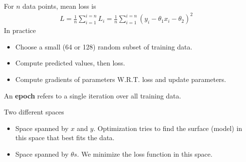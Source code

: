 \begin{frame}%
	For $n$ data points, mean  loss is 
	\begin{align*}
		L = \frac{1}{n} \sum_{i=1}^{i=n}L_i  
		  = \frac{1}{n} \sum_{i=1}^{i=n} (y_i-\theta_1 x_i-\theta_2)^2
	\end{align*}
	In practice
	\begin{itemize}
		\item Choose a small (64 or 128) random subset of training data. 
		\item Compute predicted values, then loss.
		\item Compute gradients of parameters W.R.T. loss and update parameters. 
	\end{itemize}
	An  {\bf epoch} refers to a single iteration over all training data.
	\begin{block}{Two different spaces}
		\begin{itemize}
			\item Space spanned by $x$ and $y$. Optimization tries to find the surface (model) 
			in this space that best fits the data. 
			\item Space spanned by $\theta s$. We minimize the loss function in this space.  
		\end{itemize}
	\end{block}
\end{frame}


